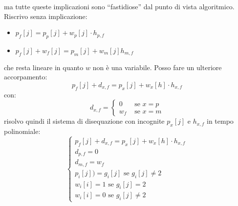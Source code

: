 \documentclass[a4paper,12pt, oneside]{book}
\begin{document}
ma tutte queste implicazioni sono ``fastidiose'' dal punto di vista
algoritmico. Riscrivo senza implicazione:
\begin{itemize}
  \item $p_f[j]=p_p[j]+w_p[j]\cdot h_{p,f}$
  \item $p_f[j]+w_f[j]=p_m[j]+w_m[j]h_{m,f}$
\end{itemize}
che resta lineare in quanto $w$ non è una variabile. Posso fare un
ulteriore accorpamento:
\[p_f[j]+d_{x,f}=p_x[j]+w_x[h]\cdot h_{x,f}\]
con:
\[d_{x,f}=
  \begin{cases}
    0 & \mbox{ se } x=p\\
    w_f & \mbox{ se } x=m
  \end{cases}
\]
risolvo quindi il sistema di disequazione con incognite $p_x[j]$ e
$h_{x,f}$ in tempo polinomiale:
\[
  \begin{cases}
    p_f[j]+d_{x,f}=p_x[j]+w_x[h]\cdot h_{x,f}\\
    d_{p,f}=0\\
    d_{m,f}=w_f\\
    p_i[j])=g_i[j] \mbox{ se } g_i[j]\neq 2\\
    w_i[i]=1 \mbox{ se } g_i[j]=2\\
    w_i[i]=0 \mbox{ se } g_i[j]\neq 2
  \end{cases}
\]
\end{document}
